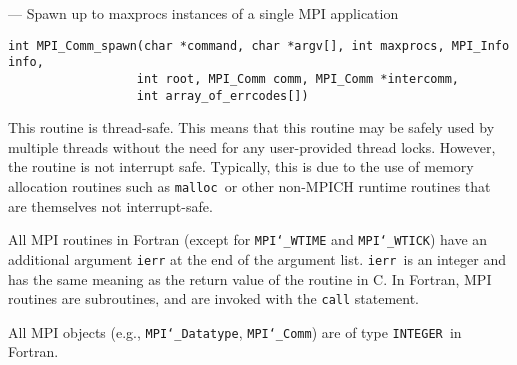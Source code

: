 \startmanpage
{}
--- Spawn up to maxprocs instances of a single MPI application 
\startvb\begin{verbatim}
int MPI_Comm_spawn(char *command, char *argv[], int maxprocs, MPI_Info info, 
                  int root, MPI_Comm comm, MPI_Comm *intercomm,
                  int array_of_errcodes[])

\end{verbatim}
\endvb

\par
{}
\par
{}
\par
This routine is thread-safe.  This means that this routine may be
safely used by multiple threads without the need for any user-provided
thread locks.  However, the routine is not interrupt safe.  Typically,
this is due to the use of memory allocation routines such as {\tt malloc
}or other non-MPICH runtime routines that are themselves not interrupt-safe.
\par
{}
All MPI routines in Fortran (except for {\tt MPI{\tt \char`\_}WTIME} and {\tt MPI{\tt \char`\_}WTICK}) have
an additional argument {\tt ierr} at the end of the argument list.  {\tt ierr
}is an integer and has the same meaning as the return value of the routine
in C.  In Fortran, MPI routines are subroutines, and are invoked with the
{\tt call} statement.
\par
All MPI objects (e.g., {\tt MPI{\tt \char`\_}Datatype}, {\tt MPI{\tt \char`\_}Comm}) are of type {\tt INTEGER
}in Fortran.
\par
